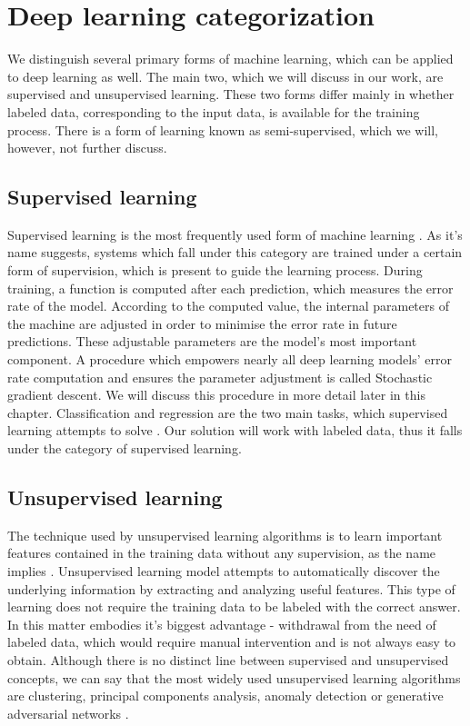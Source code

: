 \section{Deep learning categorization}
We distinguish several primary forms of machine learning, which can be applied to deep learning as well. The main two, which we will discuss in our work, are supervised and unsupervised learning.  \cite{lecundeeplearning} These two forms differ mainly in whether labeled data, corresponding to the input data, is available for the training process. There is a form of learning known as semi-supervised, which we will, however, not further discuss.

\subsection{Supervised learning}
Supervised learning  is the most frequently used form of machine learning \cite{lecundeeplearning}. As it's name suggests, systems which fall under this category are trained under a certain form of supervision, which is present to guide the learning process. During training, a function is computed after each prediction, which measures the error rate of the model. According to the computed value, the internal parameters of the machine are adjusted in order to minimise the error rate in future predictions. These adjustable parameters are the model's most important component. A procedure which empowers nearly all deep learning models' error rate computation and ensures the parameter adjustment is called Stochastic gradient descent. We will discuss this procedure in more detail later in this chapter. Classification and regression are the two main tasks, which supervised learning attempts to solve \cite{kim2019deep}. Our solution will work with labeled data, thus it falls under the category of supervised learning.

\subsection{Unsupervised learning} The technique used by unsupervised learning algorithms is to learn important features contained in the training data without any supervision, as the name implies \cite{deeplearningbook}. Unsupervised learning model attempts to automatically discover the underlying information by extracting and analyzing useful features. This type of learning does not require the training data to be labeled with the correct answer. In this matter embodies it's biggest advantage - withdrawal from the need of labeled data, which would require manual intervention and is not always easy to obtain. Although there is no distinct line between supervised and unsupervised concepts, we can say that the most widely used unsupervised learning algorithms are clustering, principal components analysis, anomaly detection or generative adversarial networks \cite{deeplearningbook, kim2019deep}.

